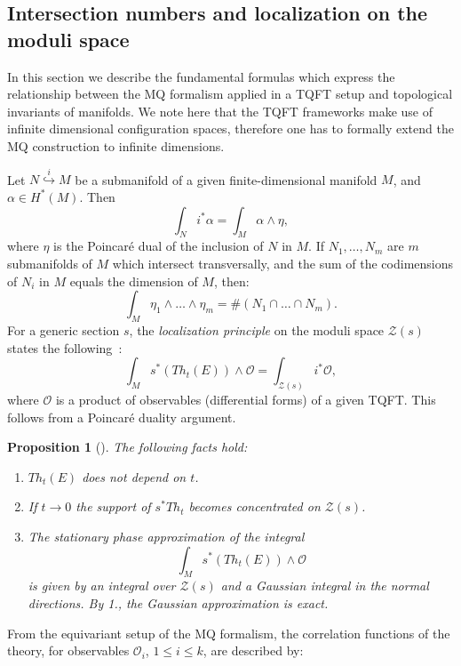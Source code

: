 \documentclass[a4paper,12pt,reqno,sumlimits]{amsart}
\theoremstyle{plain}
\newtheorem{prop}[thm]{Proposition}
\theoremstyle{definition}
\newcommand{\1}{{\bf 1}}
\newcommand{\calO}{{\mathcal O}}
\newcommand{\calZ}{{\mathcal Z}}
\renewcommand{\to}{\longrightarrow}
\newcommand{\inc}{\hookrightarrow}
\numberwithin{equation}{section}
\begin{document}

\subsection{Intersection numbers and localization on the moduli space}
\label{mqintnumbers}

In this section we describe the fundamental formulas which express the
relationship between the MQ formalism applied in a TQFT setup and topological
invariants of manifolds. We note here that the TQFT frameworks make use
of infinite dimensional configuration spaces, therefore one has to formally
extend the MQ construction to infinite dimensions. 

Let $N\stackrel{i}{\inc}M$ be a submanifold of a given finite-dimensional
manifold $M$, and $\alpha\in H^*(M)$. Then
$$
\int_N i^*\alpha=\int_M\alpha\wedge\eta,
$$
where $\eta$ is the Poincar\'e dual of the inclusion of $N$ in $M$.  If
$N_1,\dots,N_m$ are $m$ submanifolds of $M$ which intersect transversally,
and the sum of the codimensions of $N_i$ in $M$ equals the dimension of $M$,
then:
$$
\int_M\eta_1\wedge\dots\wedge\eta_m=\#(N_1\cap\dots\cap N_m).
$$
For a generic section $s$, the {\em localization principle} on the moduli
space $\calZ(s)$ states the following~\cite{cordes}:
\begin{equation}
  \label{locmodulispace}
  \int_M s^*(Th_t(E))\wedge\calO=\int_{\calZ(s)}i^*\calO,
\end{equation}
where $\calO$ is a product of observables (differential forms) of a given
TQFT.  This follows from a Poincar\'e duality argument.
\begin{prop}[\cite{cordes}]
  The following facts hold:
  \begin{enumerate}
  \item $Th_t(E)$ does not depend on $t$.
  \item If $t\to 0$ the support of $s^*Th_t$ becomes concentrated on
    $\calZ(s)$. 
  \item The stationary phase approximation of the integral
    $$
    \int_M s^*(Th_t(E))\wedge\calO
    $$
    is given by an integral over $\calZ(s)$ and a Gaussian integral in the
    normal directions. By {\em 1.}, the Gaussian approximation is exact.
  \end{enumerate}
\end{prop}
From the equivariant setup of the MQ formalism, the correlation functions of
the theory, for observables $\calO_i$, $1\le i\le k$, are described by:
\end{document}
